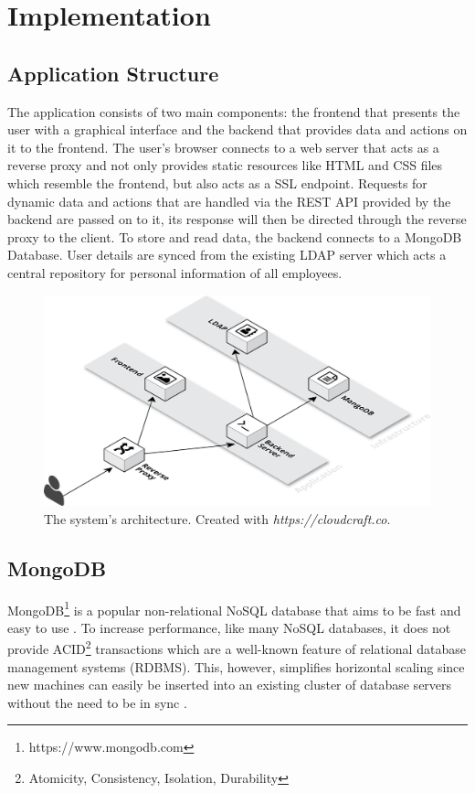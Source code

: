 \chapter{Implementation}
\section{Application Structure}
The application consists of two main components: the frontend that presents the user with a graphical interface and the backend that provides data and actions on it to the frontend.
The user's browser connects to a web server that acts as a reverse proxy and not only provides static resources like HTML and CSS files which resemble the frontend, but also acts as a SSL endpoint.
Requests for dynamic data and actions that are handled via the REST API provided by the backend are passed on to it, its response will then be directed through the reverse proxy to the client.
To store and read data, the backend connects to a MongoDB Database. User details are synced from the existing LDAP server which acts a central repository for personal information of all employees.
\begin{figure}[h]
    \centering
    \includegraphics[width=\textwidth]{images/system_architecture.png}
    \caption[System Architecture]{The system's architecture. Created with \textit{https://cloudcraft.co}.}
    \label{fig:markovchain}
\end{figure}

\newpage
\section{MongoDB}
MongoDB\footnote{https://www.mongodb.com} is a popular non-relational NoSQL database that aims to be fast and easy to use \cite[p. 10]{MongoGuide}. To increase performance, like many NoSQL databases, it does not provide ACID\footnote{Atomicity, Consistency, Isolation, Durability} transactions which are a well-known feature of relational database management systems (RDBMS). This, however, simplifies horizontal scaling since new machines can easily be inserted into an existing cluster of database servers without the need to be in sync \cite[p. 3]{MongoGuide}.

